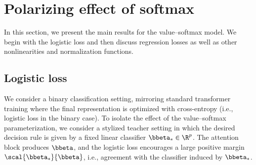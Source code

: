 \documentclass{article}
\theoremstyle{plain}
\theoremstyle{definition}
\theoremstyle{remark}
\begin{document}
\section{Polarizing effect of softmax}
%
In this section, we present the main results for the value–softmax model. We begin with the logistic loss and then discuss regression losses as well as other nonlinearities and normalization functions.

\subsection{Logistic loss}
%




We consider a binary classification setting, mirroring standard transformer training where the final representation is optimized with cross-entropy (i.e., logistic loss in the binary case). 
%
To isolate the effect of the value–softmax parameterization, we consider a stylized teacher setting in which the desired decision rule is given by a fixed linear classifier $\bbeta_* \in \R^{p}$.
%
The attention block produces $\bbeta$, and the logistic loss encourages a large positive margin $\scal{\bbeta_*} {\bbeta}$, i.e., agreement with the classifier induced by $\bbeta_*$.
\end{document}
